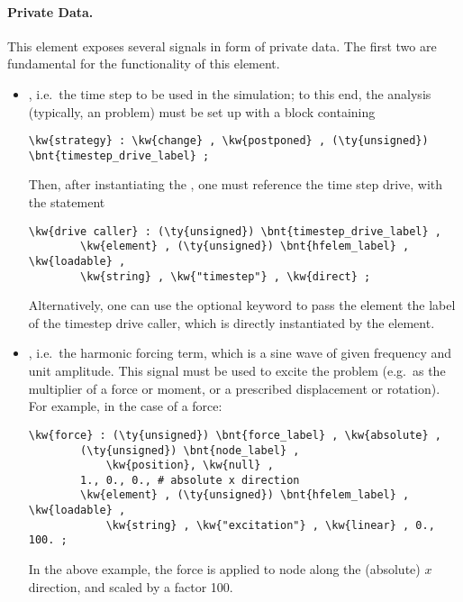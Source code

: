 \paragraph{Private Data.}
This element exposes several signals in form of private data.
The first two are fundamental for the functionality of this element.
\begin{itemize}
\item {}, i.e.\ the time step to be used in the simulation; to this end, the analysis (typically, an  problem) must be set up with a  block containing
\begin{Verbatim}[commandchars=\\\{\}]
    \kw{strategy} : \kw{change} , \kw{postponed} , (\ty{unsigned}) \bnt{timestep_drive_label} ;
\end{Verbatim}
Then, after instantiating the , one must reference the time step drive, with the statement
\begin{Verbatim}[commandchars=\\\{\}]
    \kw{drive caller} : (\ty{unsigned}) \bnt{timestep_drive_label} ,
        \kw{element} , (\ty{unsigned}) \bnt{hfelem_label} , \kw{loadable} ,
        \kw{string} , \kw{"timestep"} , \kw{direct} ;
\end{Verbatim}
Alternatively, one can use the optional keyword  to pass the element the label of the timestep drive caller,
which is directly instantiated by the element.

\item {}, i.e.\ the harmonic forcing term, which is a sine wave of given frequency and unit amplitude.
This signal must be used to excite the problem (e.g.\ as the multiplier of a force or moment, or a prescribed displacement or rotation).
For example, in the case of a force:
\begin{Verbatim}[commandchars=\\\{\}]
    \kw{force} : (\ty{unsigned}) \bnt{force_label} , \kw{absolute} ,
        (\ty{unsigned}) \bnt{node_label} ,
            \kw{position}, \kw{null} ,
        1., 0., 0., # absolute x direction
        \kw{element} , (\ty{unsigned}) \bnt{hfelem_label} , \kw{loadable} ,
            \kw{string} , \kw{"excitation"} , \kw{linear} , 0., 100. ;
\end{Verbatim}
In the above example, the force is applied to node 
along the (absolute) $x$ direction, and scaled by a factor 100.


\end{itemize}

